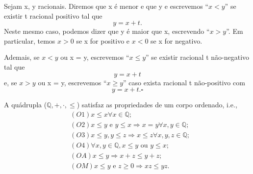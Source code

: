 \documentclass[Analysis/analysis_notes.tex]{subfiles}
\begin{document}
\begin{def*}
	Sejam x, y racionais. Diremos que x \'e menor e que y e escrevemos ``$x < y$'' se existir t racional positivo tal que
	$$
		y = x + t.
	$$
	Neste mesmo caso, podemos dizer que y \'e maior que x, escrevendo ``$x > y$''. Em particular, temos $x > 0$ se x for positivo e
	$x < 0$ se x for negativo.

	Ademais, se $x < y$ ou x = y, escrevemos ``$x \leq{y}$'' se existir racional t n\~ao-negativo tal que
	$$
		y = x + t
	$$
	e, se $x > y$ ou x = y, escrevemos ``$x \geq{y}$'' caso exista racional t n\~ao-positivo com
	$$
		y = x + t. \square
	$$
\end{def*}
A qu\'adrupla ($\mathbb{Q}, +, \cdot, \leq{}$) satisfaz as propriedades de um corpo ordenado, i.e.,
\begin{align*}
	 & (O1) x \leq{x}\forall x\in \mathbb{Q};                                          \\
	 & (O2) x\leq{y} \text{ e } y \leq{x}\Rightarrow x = y \forall x, y\in \mathbb{Q}; \\
	 & (O3) x \leq{y}, y \leq{z}\Rightarrow x \leq{z}\forall x, y, z\in \mathbb{Q};    \\
	 & (O4)\forall x, y \in \mathbb{Q}, x \leq{y} \text{ ou } y \leq{x};               \\
	 & (OA) x \leq{y}\Rightarrow x + z \leq{y + z};                                    \\
	 & (OM) x \leq{y} \text{ e } z \geq{0}\Rightarrow xz \leq{yz}.
\end{align*}
\end{document}
